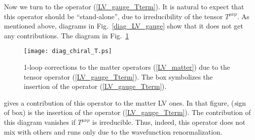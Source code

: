 \documentclass[a4paper,12pt]{article}
\begin{document}
	Now we turn to the operator (\ref{LV_gauge_Tterm}).
	It is natural to expect that this operator should be 
	``stand-alone'', due to irreducibility of the tensor
	$ T^{\mu\nu\rho} $. 
	As mentioned above, diagrams in
Fig.~\ref{diag_LV_gauge}
	show that it does not get any contributions. 
	The diagram in
Fig.~\ref{diag_LV_gauge_Tterm}
\begin{figure}[h]
\caption{\label{diag_LV_gauge_Tterm}
        1-loop corrections to the matter operators (\ref{LV_matter})
	due to the tensor operator (\ref{LV_gauge_Tterm}).
	The box symbolizes the insertion of the operator
	(\ref{LV_gauge_Tterm}).
}
\begin{center}
\texttt{[image: diag\_chiral\_T.ps]}
\end{center}
\end{figure}
	gives a contribution of this operator to the matter
	LV ones. 
	In that figure, ({\emph sign of box}) is the insertion of the 
	operator
	(\ref{LV_gauge_Tterm}).
	The contribution of this diagram vanishes if 
	$ T^{\mu\nu\rho} $
	is irreducible.
	Thus, indeed, this operator does not mix with others and
	runs only due to the wavefunction renormalization. 
	
\end{document}
